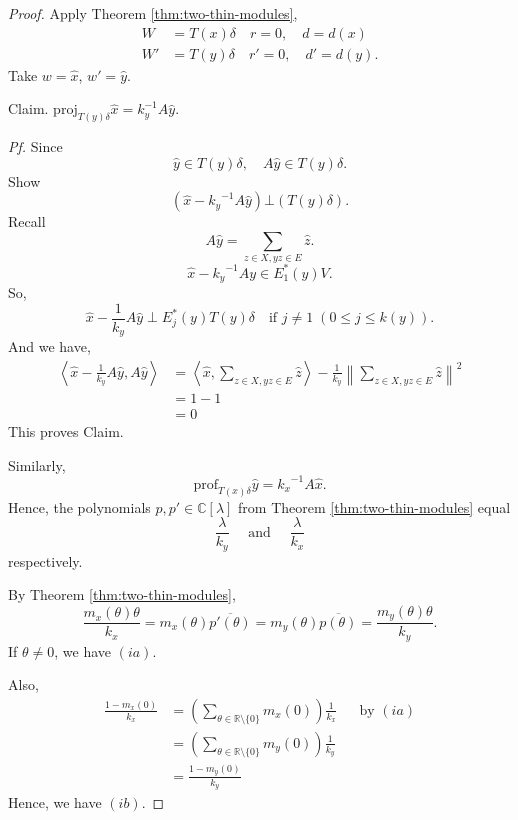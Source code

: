 \documentclass[
]{book}
\theoremstyle{definition}
\theoremstyle{definition}
\theoremstyle{definition}
\theoremstyle{definition}
\theoremstyle{remark}
\begin{document}
\begin{proof}
Apply Theorem \ref{thm:two-thin-modules},
\begin{align}
W & = T(x)\delta \quad r = 0, \quad d = d(x)\\
W' & = T(y)\delta \quad r' = 0, \quad d' = d(y).
\end{align}
Take \(w = \hat{x}\), \(w' = \hat{y}\).

Claim. \(\mathrm{proj}_{T(y)\delta}\hat{x} = k^{-1}_yA\hat{y}\).

\emph{Pf.}
Since
\[\hat{y}\in T(y)\delta, \quad A\hat{y}\in T(y)\delta.\]
Show
\[(\hat{x} - {k_y}^{-1} A\hat{y}) \bot (T(y)\delta).\]
Recall
\[A\hat{y} = \sum_{z\in X, yz\in E}\hat{z}.\]
\[\hat{x} - {k_y}^{-1}Ay \in E^*_1(y)V.\]
So,
\[\hat{x} - \frac{1}{k_y}A\hat{y} \; \bot \; E^*_j(y)T(y)\delta \quad \text{if $j\neq 1$}\; (0\leq j\leq k(y)).\]
And we have,
\begin{align}
\left\langle \hat{x} - \frac{1}{k_y}A\hat{y}, A\hat{y}\right\rangle
& = \left\langle \hat{x}, \sum_{z\in X, yz\in E}\hat{z}\right\rangle - \frac{1}{k_y}\left\|\sum_{z\in X, yz\in E}\hat{z}\right\|^2\\
& =  1 - 1\\
& = 0
\end{align}
This proves Claim.

Similarly,
\[\mathrm{prof}_{T(x)\delta}\hat{y} = {k_x}^{-1}A\hat{x}.\]
Hence, the polynomials \(p, p'\in \mathbb{C}[\lambda]\) from Theorem \ref{thm:two-thin-modules} equal
\[\frac{\lambda}{k_y} \quad \text{ and }\quad \frac{\lambda}{k_x}\]
respectively.

By Theorem \ref{thm:two-thin-modules},
\[\frac{m_x(\theta)\theta}{k_x} = m_x(\theta)\overline{p'(\theta)} = m_y(\theta)\overline{p(\theta)} = \frac{m_y(\theta)\theta}{k_y}.\]
If \(\theta\neq 0\), we have \((ia)\).

Also,
\begin{align}
\frac{1-m_x(0)}{k_x} & = \left(\sum_{\theta\in \mathbb{R}\setminus \{0\}}m_x(0)\right)\frac{1}{k_x} && \text{by $(ia)$}\\
& = \left(\sum_{\theta\in \mathbb{R}\setminus \{0\}}m_y(0)\right)\frac{1}{k_y}\\
& = \frac{1 - m_y(0)}{k_y}
\end{align}
Hence, we have \((ib)\).
\end{proof}
\end{document}
